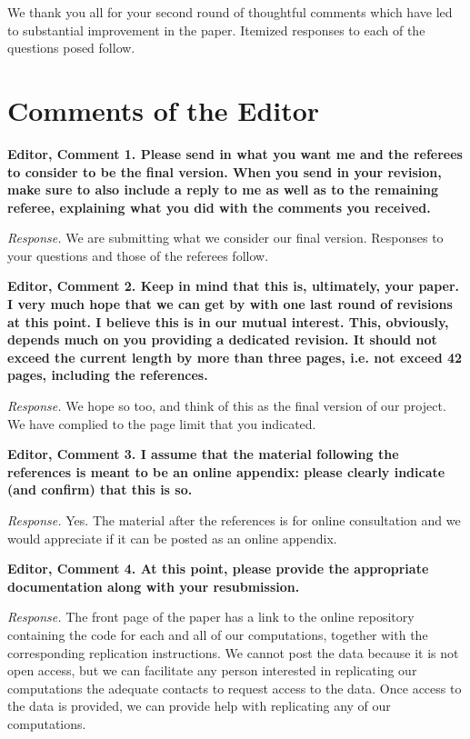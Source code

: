\restoregeometry
\doublespacing

\noindent We thank you all for your second round of thoughtful comments which have led to substantial improvement in the paper. Itemized responses to each of the questions posed follow.

\section*{Comments of the Editor}

\noindent \textbf{Editor, Comment 1. Please send in what you want me and the referees to consider to be the final version. When you send in your revision, make sure to also include a reply to me as well as to the remaining referee, explaining what you did with the comments you received.} 

\noindent \textit{Response.} We are submitting what we consider our final version. Responses to your questions and those of the referees follow. 

\noindent \textbf{Editor, Comment 2. Keep in mind that this is, ultimately, your paper. I very much hope that we can get by with one last round of revisions at this point. I believe this is in our mutual interest. This, obviously, depends much on you providing a dedicated revision. It should not exceed the current length by more than three pages, i.e. not exceed 42 pages, including the references.}

\noindent \textit{Response.} We hope so too, and think of this as the final version of our project. We have complied to the page limit that you indicated.

\noindent \textbf{Editor, Comment 3. I assume that the material following the references is meant to be an online appendix: please clearly indicate (and confirm) that this is so.}

\noindent \textit{Response.} Yes. The material after the references is for online consultation and we would appreciate if it can be posted as an online appendix.

\noindent \textbf{Editor, Comment 4. At this point, please provide the appropriate documentation along with your resubmission.}

\noindent \textit{Response.} The front page of the paper has a link to the online repository containing the code for each and all of our computations, together with the corresponding replication instructions. We cannot post the data because it is not open access, but we can facilitate any person interested in replicating our computations the adequate contacts to request access to the data. Once access to the data is provided, we can provide help with replicating any of our computations.

